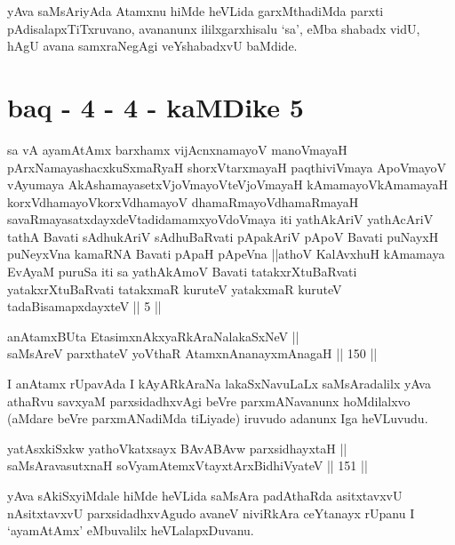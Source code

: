 \begin{artha}
yAva saMsAriyAda Atamxnu hiMde heVLida garxMthadiMda parxti
pAdisalapxTiTxruvano, avananunx ililxgarxhisalu `sa', eMba shabadx
vidU, hAgU avana samxraNegAgi veYshabadxvU baMdide.
\end{artha}

\section*{baq - 4 - 4 - kaMDike 5}

\begin{shl}
sa vA ayamAtAmx barxhamx vijAcnxnamayoV manoVmayaH pArxNamayashacxkuSxmaRyaH shorxVtarxmayaH paqthiviVmaya ApoVmayoV vAyumaya AkAshamayasetxVjoVmayoV\s teVjoVmayaH kAmamayoV\s kAmamayaH korxVdhamayoV\s korxVdhamayoV dhamaRmayoV\s dhamaRmayaH savaRmayasatxdayxdeVtadidamamxyoV\s doVmaya iti yathAkAriV yathAcAriV tathA Bavati sAdhukAriV sAdhuBaRvati pApakAriV pApoV Bavati puNayxH puNeyxVna kamaRNA Bavati pApaH pApeVna ||athoV KalAvxhuH kAmamaya EvAyaM puruSa iti sa yathAkAmoV Bavati tatakxrXtuBaRvati yatakxrXtuBaRvati tatakxmaR kuruteV yatakxmaR kuruteV tadaBisamapxdayxteV || 5 ||
\end{shl}

\begin{shl}
anAtamxBUta EtasimxnAkxyaRkAraNalakaSxNeV || \\
saMsAreV parxthateV yoV\s thaR AtamxnA\s nanayxmAnagaH \hfill || 150 ||  
\end{shl}

\begin{artha}
I anAtamx rUpavAda I kAyARkAraNa lakaSxNavuLaLx saMsAradalilx yAva
athaRvu savxyaM parxsidadhxvAgi beVre parxmANavanunx hoMdilalxvo
(aMdare beVre parxmANadiMda tiLiyade) iruvudo adanunx Iga heVLuvudu.
\end{artha}


\begin{shl}
yatAsxkiSxkw yathoVkatxsayx BAvABAvw parxsidhayxtaH || \\
saMsAravasutxnaH soV\s yamAtemxVtayxtArxBidhiVyateV \hfill || 151 ||  
\end{shl}

\begin{artha}
yAva sAkiSxyiMdale hiMde heVLida saMsAra padAthaRda asitxtavxvU
nAsitxtavxvU parxsidadhxvAgudo avaneV niviRkAra ceYtanayx rUpanu I
`ayamAtAmx' eMbuvalilx heVLalapxDuvanu.
\end{artha}

